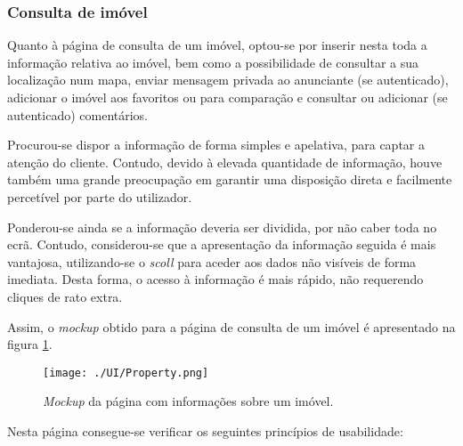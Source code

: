 \subsubsection{Consulta de imóvel}

Quanto à página de consulta de um imóvel, optou-se por inserir nesta toda a informação relativa ao imóvel, bem como a possibilidade de consultar a sua localização num mapa, enviar mensagem privada ao anunciante (se autenticado), adicionar o imóvel aos favoritos ou para comparação e consultar ou adicionar (se autenticado) comentários.

Procurou-se dispor a informação de forma simples e apelativa, para captar a atenção do cliente. Contudo, devido à elevada quantidade de informação, houve também uma grande preocupação em garantir uma disposição direta e facilmente percetível por parte do utilizador.

Ponderou-se ainda se a informação deveria ser dividida, por não caber toda no ecrã. Contudo, considerou-se que a apresentação da informação seguida é mais vantajosa, utilizando-se o \textit{scoll} para aceder aos dados não visíveis de forma imediata. Desta forma, o acesso à informação é mais rápido, não requerendo cliques de rato extra.

Assim, o \textit{mockup} obtido para a página de consulta de um imóvel é apresentado na figura \ref{fig:property}.

\begin{figure}[H]
    \centering
    \texttt{[image: ./UI/Property.png]}
    \caption{\textit{Mockup} da página com informações sobre um imóvel.}
    \label{fig:property}
\end{figure}

Nesta página consegue-se verificar os seguintes princípios de usabilidade:

